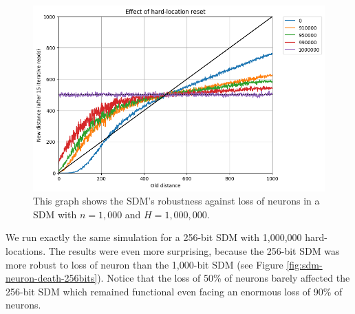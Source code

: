 \begin{figure}[!p]
\centering\includegraphics[width=\textwidth]{images02/new-images/sdm-neuron-death.png}
\caption{This graph shows the SDM's robustness against loss of neurons in a SDM with $n=1,000$ and $H=1,000,000$.
\label{fig:sdm-neuron-death-details}}
\end{figure}

We run exactly the same simulation for a 256-bit SDM with 1,000,000 hard-locations. The results were even more surprising, because the 256-bit SDM was more robust to loss of neuron than the 1,000-bit SDM (see Figure \ref{fig:sdm-neuron-death-256bits}). Notice that the loss of 50\% of neurons barely affected the 256-bit SDM which remained functional even facing an enormous loss of 90\% of neurons.

